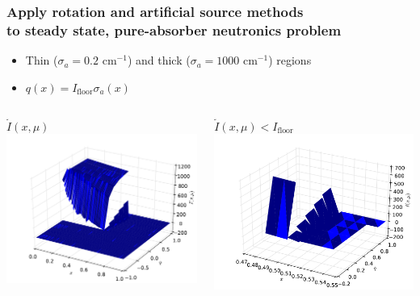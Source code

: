 \documentclass[xcolor=dvipsnames,hyperref={pdfpagelabels=false},unknownkeysallowed]{beamer}
\renewcommand{\u}[1]{\underline{#1}}
\newlength{\wideitemsep}
\let\olditem\item
\renewcommand{\item}{\setlength{\itemsep}{\wideitemsep}\olditem}
\begin{document}
\begin{frame}
    \frametitle{Apply rotation and artificial source methods   \\ to steady state, pure-absorber  neutronics problem}
    {\addtolength{\leftmargini}{-1.2cm}
    \begin{itemize}
        \item Thin ($\sigma_a=0.2$ cm$^{-1}$) and thick ($\sigma_a=1000$ cm$^{-1}$)
            regions 
            \vspace{-0.15in}
        \item $q(x)={I_{\text{floor}}}{\sigma_a(x)}$ 
    \end{itemize}
}
\vspace{0.2in}
    \begin{columns}
    \begin{column}{0.5\textwidth}
        \vspace{0pt}
  \centering
  \u{${\tilde I(x,\mu)}$}
    \includegraphics[width=\linewidth]{neut_ang_full.pdf}
    \end{column}
    \begin{column}{0.5\textwidth}
        \vspace{0pt}
        \centering
        \u{${\tilde I(x,\mu)}<I_{\text{floor}}$}
        \includegraphics[width=\linewidth]{neut_ang_zoom.pdf}

\end{column}
\end{columns}
\end{frame}
\end{document}
